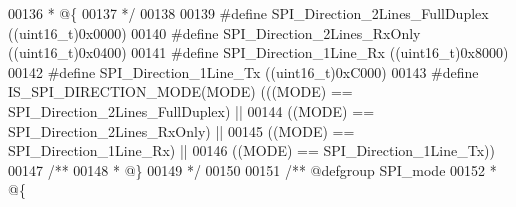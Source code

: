 \begin{DoxyCode}
00136 \textcolor{comment}{  * @\{}
00137 \textcolor{comment}{  */}
00138 
00139 \textcolor{preprocessor}{#}\textcolor{preprocessor}{define} \textcolor{preprocessor}{SPI\_Direction\_2Lines\_FullDuplex} \textcolor{preprocessor}{(}\textcolor{preprocessor}{(}\textcolor{preprocessor}{uint16\_t}\textcolor{preprocessor}{)}0x0000\textcolor{preprocessor}{)}
00140 \textcolor{preprocessor}{#}\textcolor{preprocessor}{define} \textcolor{preprocessor}{SPI\_Direction\_2Lines\_RxOnly}     \textcolor{preprocessor}{(}\textcolor{preprocessor}{(}\textcolor{preprocessor}{uint16\_t}\textcolor{preprocessor}{)}0x0400\textcolor{preprocessor}{)}
00141 \textcolor{preprocessor}{#}\textcolor{preprocessor}{define} \textcolor{preprocessor}{SPI\_Direction\_1Line\_Rx}          \textcolor{preprocessor}{(}\textcolor{preprocessor}{(}\textcolor{preprocessor}{uint16\_t}\textcolor{preprocessor}{)}0x8000\textcolor{preprocessor}{)}
00142 \textcolor{preprocessor}{#}\textcolor{preprocessor}{define} \textcolor{preprocessor}{SPI\_Direction\_1Line\_Tx}          \textcolor{preprocessor}{(}\textcolor{preprocessor}{(}\textcolor{preprocessor}{uint16\_t}\textcolor{preprocessor}{)}0xC000\textcolor{preprocessor}{)}
00143 \textcolor{preprocessor}{#}\textcolor{preprocessor}{define} \textcolor{preprocessor}{IS\_SPI\_DIRECTION\_MODE}\textcolor{preprocessor}{(}\textcolor{preprocessor}{MODE}\textcolor{preprocessor}{)} \textcolor{preprocessor}{(}\textcolor{preprocessor}{(}\textcolor{preprocessor}{(}\textcolor{preprocessor}{MODE}\textcolor{preprocessor}{)} \textcolor{preprocessor}{==} 
      SPI_Direction_2Lines_FullDuplex\textcolor{preprocessor}{)} \textcolor{preprocessor}{||}
00144                                      \textcolor{preprocessor}{(}\textcolor{preprocessor}{(}\textcolor{preprocessor}{MODE}\textcolor{preprocessor}{)} \textcolor{preprocessor}{==} SPI_Direction_2Lines_RxOnly\textcolor{preprocessor}{)} \textcolor{preprocessor}{||}
00145                                      \textcolor{preprocessor}{(}\textcolor{preprocessor}{(}\textcolor{preprocessor}{MODE}\textcolor{preprocessor}{)} \textcolor{preprocessor}{==} SPI_Direction_1Line_Rx\textcolor{preprocessor}{)} \textcolor{preprocessor}{||}
00146                                      \textcolor{preprocessor}{(}\textcolor{preprocessor}{(}\textcolor{preprocessor}{MODE}\textcolor{preprocessor}{)} \textcolor{preprocessor}{==} SPI_Direction_1Line_Tx\textcolor{preprocessor}{)}\textcolor{preprocessor}{)}
00147 \textcolor{comment}{/**}
00148 \textcolor{comment}{  * @\}}
00149 \textcolor{comment}{  */}
00150 
00151 \textcolor{comment}{/** @defgroup SPI\_mode }
00152 \textcolor{comment}{  * @\{}

\end{DoxyCode}
